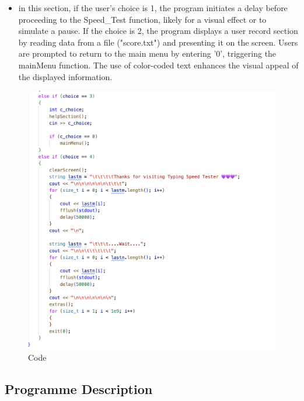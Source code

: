\begin{itemize}

        \item in this section, if the user's choice is 1, the program initiates a delay before proceeding to the Speed\_Test function, likely for a visual effect or to simulate a pause. If the choice is 2, the program displays a user record section by reading data from a file ("score.txt") and presenting it on the screen. Users are prompted to return to the main menu by entering '0', triggering the mainMenu function. The use of color-coded text enhances the visual appeal of the displayed information.

\end{itemize}
\newpage
\begin{figure}[h]
     \includegraphics[scale=0.25]{CodeScreenShot/choice3-4.png}
    \caption{Code}
    \label{fig:code-screenshots}
\end{figure}

\subsection{Programme Description}

